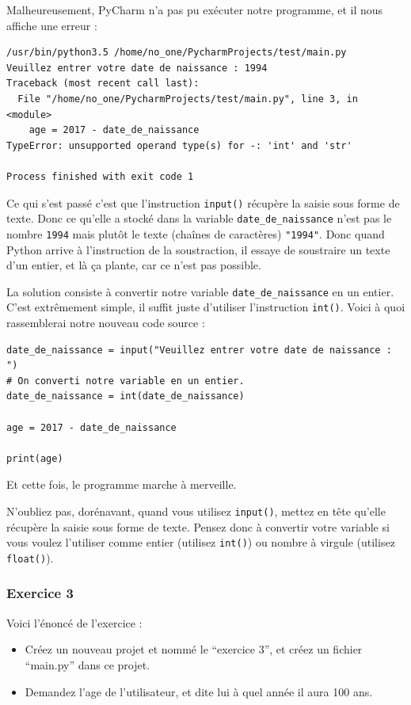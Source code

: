\documentclass[12pt]{article}
\newcommand{\code}[1]{\colorbox{light-gray}{\texttt{#1}}}
\begin{document}
            Malheureusement, PyCharm n'a pas pu exécuter notre programme, et il nous affiche une erreur :
            \begin{lstlisting}[style=exec_result]
/usr/bin/python3.5 /home/no_one/PycharmProjects/test/main.py
Veuillez entrer votre date de naissance : 1994
Traceback (most recent call last):
  File "/home/no_one/PycharmProjects/test/main.py", line 3, in <module>
    age = 2017 - date_de_naissance
TypeError: unsupported operand type(s) for -: 'int' and 'str'

Process finished with exit code 1
            \end{lstlisting}

            Ce qui s'est passé c'est que l'instruction \code{input()} récupère la saisie sous forme de texte. Donc
            ce qu'elle a stocké dans la variable \code{date\_de\_naissance} n'est pas le nombre \code{1994} mais plutôt
            le texte (chaînes de caractères) \code{"1994"}. Donc quand Python arrive à l'instruction de la soustraction,
            il essaye de soustraire un texte d'un entier, et là ça plante, car ce n'est pas possible.

            La solution consiste à convertir notre variable \code{date\_de\_naissance} en un entier. C'est extrêmement 
            simple, il suffit juste d'utiliser l'instruction \code{int()}. Voici à quoi rassemblerai notre nouveau
            code source :
            \begin{lstlisting}[style=code, breaklines=false]
date_de_naissance = input("Veuillez entrer votre date de naissance : ")
# On converti notre variable en un entier.
date_de_naissance = int(date_de_naissance)

age = 2017 - date_de_naissance

print(age) 
            \end{lstlisting}

            Et cette fois, le programme marche à merveille. 

            N'oubliez pas, dorénavant, quand vous utilisez \code{input()},
            mettez en tête qu'elle récupère la saisie sous forme de texte. Pensez donc à convertir votre variable si 
            vous voulez l'utiliser comme entier (utilisez \code{int()}) ou nombre à virgule (utilisez \code{float()}).

        \subsubsection{Exercice 3}
            Voici l'énoncé de l'exercice :
            \begin{itemize}
                \item Créez un nouveau projet et nommé le ``exercice 3'', et créez un fichier ``main.py'' dans ce
                    projet.
                \item Demandez l'age de l'utilisateur, et dite lui à quel année il aura 100 ans.
            \end{itemize}
\end{document}
